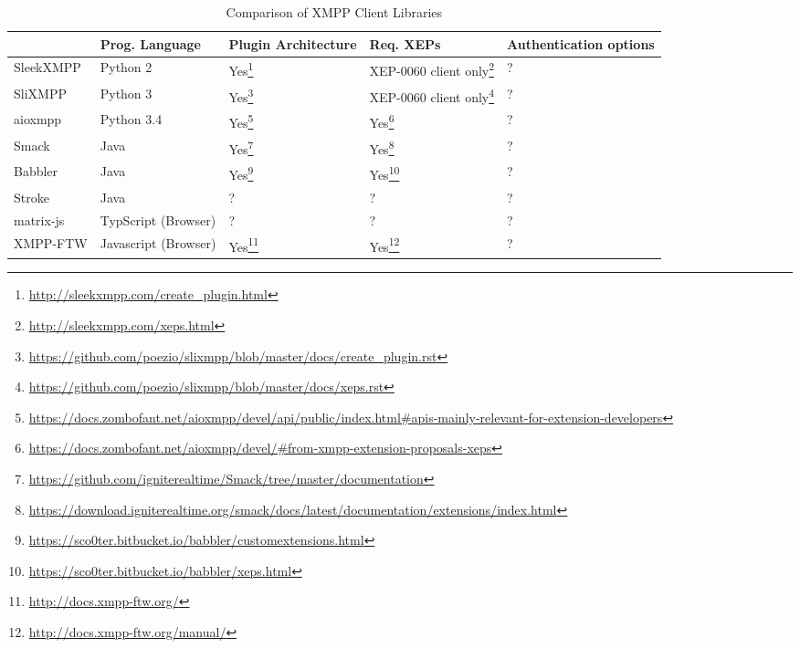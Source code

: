 \begin{sidewaystable}
    \centering
    \caption{Comparison of XMPP Client Libraries}
    \label{tbl:language-comparison-ds}
    \begin{tabu}{X|X X X X}
        \hline
        & Prog. Language
        & Plugin Architecture
        & Req. XEPs
        & Authentication options
        \\ \hline

        SleekXMPP
        & Python 2
        & Yes\footnote{\url{http://sleekxmpp.com/create_plugin.html}}
        & XEP-0060 client only\footnote{\url{http://sleekxmpp.com/xeps.html}}
        & ?
        \\

        SliXMPP
        & Python 3
        & Yes\footnote{\url{https://github.com/poezio/slixmpp/blob/master/docs/create_plugin.rst}}
        & XEP-0060 client only\footnote{\url{https://github.com/poezio/slixmpp/blob/master/docs/xeps.rst}}
        & ?
        \\

        aioxmpp
        & Python 3.4
        & Yes\footnote{\url{https://docs.zombofant.net/aioxmpp/devel/api/public/index.html\#apis-mainly-relevant-for-extension-developers}}
        & Yes\footnote{\url{https://docs.zombofant.net/aioxmpp/devel/\#from-xmpp-extension-proposals-xeps}}
        & ?
        \\

        Smack
        & Java
        & Yes\footnote{\url{https://github.com/igniterealtime/Smack/tree/master/documentation}}
        & Yes\footnote{\url{https://download.igniterealtime.org/smack/docs/latest/documentation/extensions/index.html}}
        & ?
        \\

        Babbler
        & Java
        & Yes\footnote{\url{https://sco0ter.bitbucket.io/babbler/customextensions.html}}
        & Yes\footnote{\url{https://sco0ter.bitbucket.io/babbler/xeps.html}}
        & ?
        \\

        Stroke
        & Java
        & ?
        & ?
        & ?
        \\

        matrix-js
        & TypScript (Browser)
        & ?
        & ?
        & ?
        \\

        XMPP-FTW
        & Javascript (Browser)
        & Yes\footnote{\url{http://docs.xmpp-ftw.org/}}
        & Yes\footnote{\url{http://docs.xmpp-ftw.org/manual/}}
        & ?
        \\
    \end{tabu}
\end{sidewaystable}
